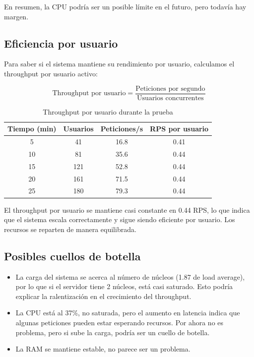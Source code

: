 \documentclass[10pt]{book}
\begin{document}
En resumen, la CPU podría ser un posible límite en el futuro, pero todavía hay margen.

\subsection{Eficiencia por usuario}

Para saber si el sistema mantiene su rendimiento por usuario, calculamos el throughput por usuario activo:

\[
\text{Throughput por usuario} = \frac{\text{Peticiones por segundo}}{\text{Usuarios concurrentes}}
\]

\begin{table}[H]
\centering
\begin{tabular}{|c|c|c|c|}
\hline
\textbf{Tiempo (min)} & \textbf{Usuarios} & \textbf{Peticiones/s} & \textbf{RPS por usuario} \\
\hline
5  & 41  & 16.8  & 0.41 \\
10 & 81  & 35.6  & 0.44 \\
15 & 121 & 52.8  & 0.44 \\
20 & 161 & 71.5  & 0.44 \\
25 & 180 & 79.3  & 0.44 \\
\hline
\end{tabular}
\caption{Throughput por usuario durante la prueba}
\end{table}

El throughput por usuario se mantiene casi constante en 0.44 RPS, lo que indica que el sistema escala correctamente y sigue siendo eficiente por usuario. Los recursos se reparten de manera equilibrada.

\subsection{Posibles cuellos de botella}

\begin{itemize}
  \item La carga del sistema se acerca al número de núcleos (1.87 de load average), por lo que si el servidor tiene 2 núcleos, está casi saturado. Esto podría explicar la ralentización en el crecimiento del throughput.
  
  \item La CPU está al 37\%, no saturada, pero el aumento en latencia indica que algunas peticiones pueden estar esperando recursos. Por ahora no es problema, pero si sube la carga, podría ser un cuello de botella.
  
  \item La RAM se mantiene estable, no parece ser un problema.
\end{itemize}
\end{document}
